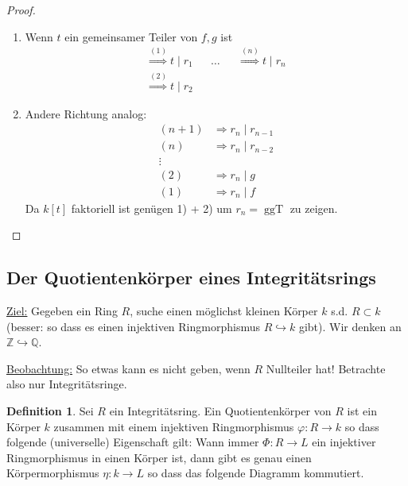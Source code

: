 \documentclass[12pt,parskip=full]{scrartcl}
\newcommand{\setZ}{\mathbb{Z}}
\newcommand{\setQ}{\mathbb{Q}}
\newcommand{\heading}{\underline}
\theoremstyle{definition}
\newtheorem{definition}[theorem]{Definition}
\theoremstyle{remark}
\begin{document}
	\begin{proof}
		\begin{enumerate}
			\item Wenn $t$ ein gemeinsamer Teiler von $f,g$ ist
			\begin{align*}
				\overset{(1)}{\Longrightarrow} t \mid r_1 && \dots && \overset{(n)}{\Longrightarrow} t \mid r_n \\
				\overset{(2)}{\Longrightarrow} t \mid r_2
			\end{align*}
			\item Andere Richtung analog:
			\begin{align*}
				(n+1) &\Longrightarrow r_n \mid r_{n-1} \\
				(n) &\Longrightarrow r_n \mid r_{n-2} \\
				\vdots \\
				(2) &\Longrightarrow r_n \mid g \\
				(1) &\Longrightarrow r_n \mid f
			\end{align*}
			Da $k[t]$ faktoriell ist genügen 1) + 2) um $r_n = \operatorname{ggT}$ zu zeigen.
		\end{enumerate}
	\end{proof}

	\subsection{Der Quotientenkörper eines Integritätsrings}
	
	\heading{Ziel:} Gegeben ein Ring $R$, suche einen möglichst kleinen Körper $k$ s.d. $R \subset k$ (besser: so dass es einen injektiven Ringmorphismus $R \hookrightarrow k$ gibt). Wir denken an $\setZ \hookrightarrow \setQ$.
	
	\heading{Beobachtung:} So etwas kann es nicht geben, wenn $R$ Nullteiler hat! Betrachte also nur Integritätsringe.
	
	\begin{definition}
		Sei $R$ ein Integritätsring. Ein Quotientenkörper von $R$ ist ein Körper $k$ zusammen mit einem injektiven Ringmorphismus $\varphi: R \to k$ so dass folgende (universelle) Eigenschaft gilt: Wann immer $\Phi: R \to L$ ein injektiver Ringmorphismus in einen Körper ist, dann gibt es genau einen Körpermorphismus $\eta: k \to L$ so dass das folgende Diagramm kommutiert.
		
		\begin{center}
		\end{center}
	\end{definition}
\end{document}
